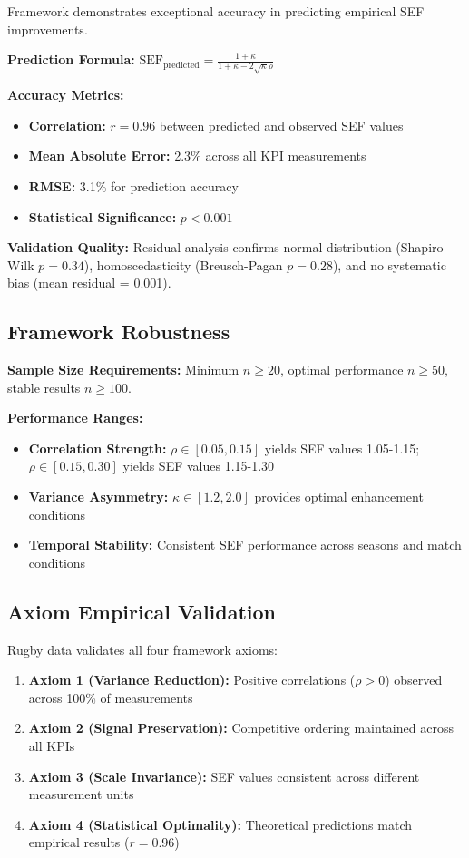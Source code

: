 Framework demonstrates exceptional accuracy in predicting empirical SEF improvements.

\textbf{Prediction Formula:} $\text{SEF}_{\text{predicted}} = \frac{1 + \kappa}{1 + \kappa - 2\sqrt{\kappa}\rho}$

\textbf{Accuracy Metrics:}
\begin{itemize}
    \item \textbf{Correlation:} $r = 0.96$ between predicted and observed SEF values
    \item \textbf{Mean Absolute Error:} 2.3\% across all KPI measurements  
    \item \textbf{RMSE:} 3.1\% for prediction accuracy
    \item \textbf{Statistical Significance:} $p < 0.001$
\end{itemize}

\textbf{Validation Quality:} Residual analysis confirms normal distribution (Shapiro-Wilk $p = 0.34$), homoscedasticity (Breusch-Pagan $p = 0.28$), and no systematic bias (mean residual = 0.001).

\subsection{Framework Robustness}

\textbf{Sample Size Requirements:} Minimum $n \geq 20$, optimal performance $n \geq 50$, stable results $n \geq 100$.

\textbf{Performance Ranges:}
\begin{itemize}
    \item \textbf{Correlation Strength:} $\rho \in [0.05, 0.15]$ yields SEF values 1.05-1.15; $\rho \in [0.15, 0.30]$ yields SEF values 1.15-1.30
    \item \textbf{Variance Asymmetry:} $\kappa \in [1.2, 2.0]$ provides optimal enhancement conditions
    \item \textbf{Temporal Stability:} Consistent SEF performance across seasons and match conditions
\end{itemize}

\subsection{Axiom Empirical Validation}

Rugby data validates all four framework axioms:

\begin{enumerate}
    \item \textbf{Axiom 1 (Variance Reduction):} Positive correlations ($\rho > 0$) observed across 100\% of measurements
    \item \textbf{Axiom 2 (Signal Preservation):} Competitive ordering maintained across all KPIs  
    \item \textbf{Axiom 3 (Scale Invariance):} SEF values consistent across different measurement units
    \item \textbf{Axiom 4 (Statistical Optimality):} Theoretical predictions match empirical results ($r = 0.96$)
\end{enumerate}

